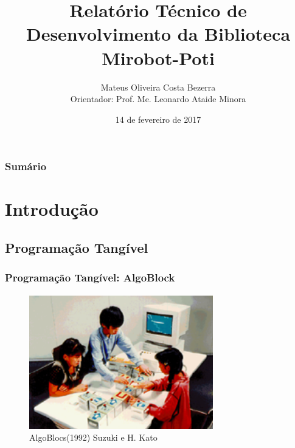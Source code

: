 \documentclass{beamer}
\begin{document}
 
\title[IFRN - CNAT]
      {Relatório Técnico de Desenvolvimento da Biblioteca Mirobot-Poti}
      \author[Mateus Oliveira Costa Bezerra]
             {Mateus Oliveira Costa Bezerra \\ Orientador: Prof. Me. Leonardo Ataide Minora}
  \date{14 de fevereiro de 2017}

\begin{frame}
  \label{capa}
  \maketitle
\end{frame}

\begin{frame}
  \label{sumario}
  \frametitle{Sumário}
  \tableofcontents
  
\end{frame}

\begin{frame}
  \label{tangivel}
  \section{Introdução}
  \subsection{Programação Tangível}
  \frametitle{Programação Tangível: AlgoBlock}
       \begin{center}
         \begin{figure}
           
         \includegraphics[width=8cm]{imagens/tangible.png}
          \caption{\tiny AlgoBlocs(1992) Suzuki e H. Kato}
         \end{figure}


     \end{center}
\end{frame}
\end{document}
